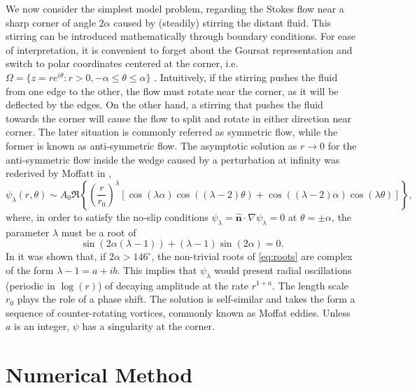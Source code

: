 \documentclass{article}
\newcommand{\uvec}[1]{\mathbf{\hat{#1}}}
\begin{document}
We now consider the simplest model problem, regarding the Stokes flow near a
sharp corner of angle $2\alpha$ caused by (steadily) stirring the distant
fluid. This stirring can be introduced mathematically through boundary
conditions. For ease of interpretation, it is convenient to forget about the
Goursat representation and switch to polar coordinates centered at the corner,
i.e. $\Omega = \{z = re^{i\theta} : r > 0, -\alpha \leq \theta \leq \alpha \}$
. Intuitively, if the stirring pushes the fluid from one edge to the other, the
flow must rotate near the corner, as it will be deflected by the edges. On the
other hand, a stirring that pushes the fluid towards the corner will cause the
flow to split and rotate in either direction near corner. The later situation
is commonly referred as symmetric flow, while the former is known as
anti-symmetric flow. The asymptotic solution as $r\to 0$ for the anti-symmetric
flow inside the wedge caused by a perturbation at infinity was rederived by
Moffatt in \cite{moffatt64},
\begin{equation}\label{eq:antisym}
\psi_\lambda(r,\theta) \sim A_0\Re\left\{\left(\frac{r}{r_0}\right)^\lambda 
   \left[\cos{(\lambda\alpha)}\cos{\left((\lambda-2)\theta\right)} +
   \cos{\left((\lambda-2)\alpha\right)}\cos{(\lambda\theta)}\right]\right\},
\end{equation}
where, in order to satisfy the no-slip conditions
$\psi_\lambda=\uvec{n}\cdot\nabla\psi_\lambda=0$ at $\theta=\pm\alpha$, the
parameter $\lambda$ must be a root of
\begin{equation}\label{eq:roots}
\sin{\left(2\alpha(\lambda-1)\right)} + (\lambda-1)\sin{(2\alpha)}=0.
\end{equation}
In \cite{dean49} it was shown that, if $2\alpha>146^\circ$, the non-trivial
roots of \eqref{eq:roots} are complex of the form $\lambda-1=a + ib$. This
implies that $\psi_\lambda$ would present radial oscillations (periodic in
$\log(r)$) of decaying amplitude at the rate  $r^{1+a}$. The length scale $r_0$
plays the role of a phase shift. The solution is self-similar and takes the
form a sequence of counter-rotating vortices, commonly known as Moffat eddies.
Unless $a$ is an integer, $\psi$ has a singularity at the corner.

\section{Numerical Method \label{sec:method}}
\end{document}
